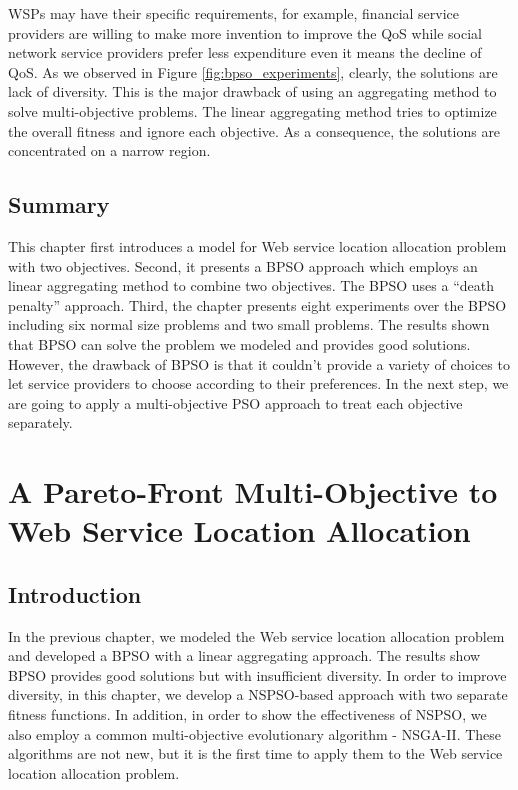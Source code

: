 WSPs may have their specific requirements, for example, financial service providers are willing to make more invention to improve the QoS while social network 
service providers prefer less expenditure even it means the decline of QoS. 
As we observed in Figure \ref{fig:bpso_experiments},
clearly, the solutions are lack of diversity. 
This is the major drawback of using an aggregating method to solve multi-objective problems. The linear
aggregating method tries to optimize the overall fitness and ignore each objective. As a consequence, the 
solutions are concentrated on a narrow region.


\section{Summary} 
This chapter first introduces a model for Web service location allocation problem with two objectives.
Second, it presents a BPSO approach which employs an linear aggregating method to combine two objectives. 
The BPSO uses a ``death penalty'' approach. Third, the chapter presents eight experiments over the BPSO  including six normal size problems and two small problems. 
The results shown that BPSO can solve the problem we modeled and provides good 
solutions. However, the drawback of BPSO is that it couldn't provide a variety of choices to let service providers to choose according to their preferences. 
In the next step, we are going to apply a multi-objective PSO approach to treat each objective separately.


\chapter{A Pareto-Front Multi-Objective to Web Service Location Allocation}
\label{C:multi}
\section{Introduction}
In the previous chapter, we modeled the Web service location allocation problem and developed a BPSO with a linear aggregating approach.
The results show BPSO provides good solutions but with insufficient diversity. In order to improve diversity, 
in this chapter, we develop a NSPSO-based approach with two separate fitness functions. 
In addition, in order to show the effectiveness of NSPSO, we also employ a common multi-objective evolutionary algorithm - NSGA-II.
These algorithms are not new, but it is the first time to apply them to the Web service location allocation problem.

